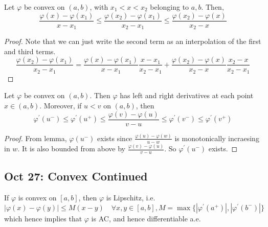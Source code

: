   \begin{lemma}
    Let $\varphi$ be convex on $(a, b)$, with $x_1 < x < x_2$ belonging to $a, b$. Then, 
    \begin{equation}
      \frac{\varphi(x) - \varphi(x_1)}{x - x_1} \leq \frac{\varphi(x_2) - \varphi(x_1)}{x_2 - x_1} \leq \frac{\varphi(x_2) - \varphi(x)}{x_2 - x} 
    \end{equation}
  \end{lemma}
  \begin{proof}
    Note that we can just write the second term as an interpolation of the first and third terms. 
    \begin{equation}
      \frac{\varphi(x_2) - \varphi(x_1)}{x_2 - x_1} = \frac{\varphi(x) - \varphi(x_1)}{x - x_1} \frac{x - x_1}{x_2 - x_1} + \frac{\varphi(x_2) - \varphi(x)}{x_2 - x} \frac{x_2 - x}{x_2 - x_1}
    \end{equation}
  \end{proof}

  \begin{theorem}
    Let $\varphi$ be convex on $(a, b)$. Then $\varphi$ has left and right derivatives at each point $x \in (a, b)$. Moreover, if $u < v$ on $(a, b)$, then 
    \begin{equation}
      \varphi^\prime (u^-) \leq \varphi^\prime (u^+) \leq \frac{\varphi(v) - \varphi(u)}{v - u} \leq \varphi^\prime (v^-) \leq \varphi^\prime (v^+)
    \end{equation}
  \end{theorem}
  \begin{proof}
    From lemma, $\varphi(u^-)$ exists since $\frac{\varphi(u) - \varphi(w)}{u - w}$ is monotonically incraesing in $w$. It is also bounded from above by $\frac{\varphi(v) - \varphi(u)}{v - u}$. So $\varphi^\prime(u^-)$ exists. 
  \end{proof}

\subsection{Oct 27: Convex Continued} 

  \begin{corollary}
    If $\varphi$ is convex on $[a, b]$, then $\varphi$ is Lipschitz, i.e.
    \begin{equation}
      | \varphi(x) - \varphi(y)| \leq M (x - y)  \quad \forall x, y \in [a, b], M = \max\{ |\varphi^\prime (a^+)|, | \varphi^\prime (b^-)| \}
    \end{equation}
    which hence implies that $\varphi$ is AC, and hence differentiable a.e.
  \end{corollary}

